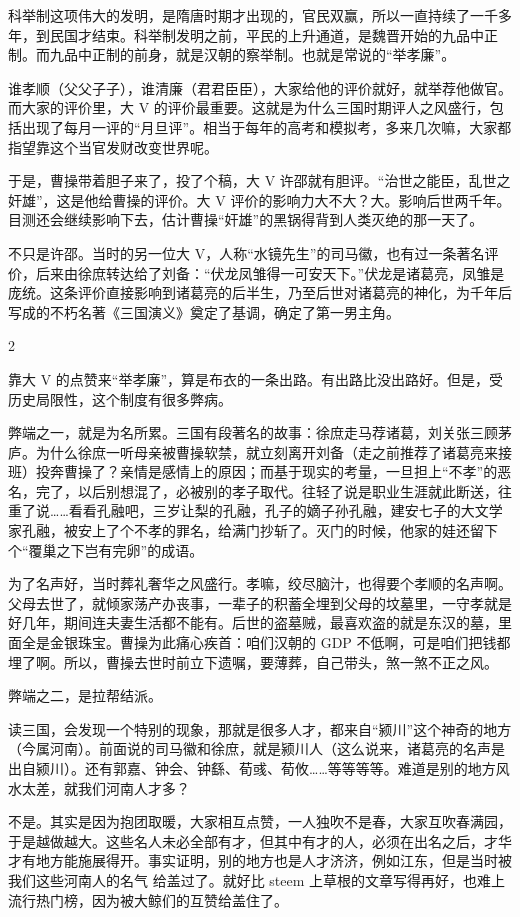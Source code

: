 \documentclass[]{ctexbook}
\begin{document}
科举制这项伟大的发明，是隋唐时期才出现的，官民双赢，所以一直持续了一千多年，到民国才结束。科举制发明之前，平民的上升通道，是魏晋开始的九品中正制。而九品中正制的前身，就是汉朝的察举制。也就是常说的``举孝廉''。

谁孝顺（父父子子），谁清廉（君君臣臣），大家给他的评价就好，就举荐他做官。而大家的评价里，大 V 的评价最重要。这就是为什么三国时期评人之风盛行，包括出现了每月一评的``月旦评''。相当于每年的高考和模拟考，多来几次嘛，大家都指望靠这个当官发财改变世界呢。

于是，曹操带着胆子来了，投了个稿，大 V 许邵就有胆评。``治世之能臣，乱世之奸雄''，这是他给曹操的评价。大 V 评价的影响力大不大？大。影响后世两千年。目测还会继续影响下去，估计曹操``奸雄''的黑锅得背到人类灭绝的那一天了。

不只是许邵。当时的另一位大 V，人称``水镜先生''的司马徽，也有过一条著名评价，后来由徐庶转达给了刘备：``伏龙凤雏得一可安天下。''伏龙是诸葛亮，凤雏是庞统。这条评价直接影响到诸葛亮的后半生，乃至后世对诸葛亮的神化，为千年后写成的不朽名著《三国演义》奠定了基调，确定了第一男主角。

2

靠大 V 的点赞来``举孝廉''，算是布衣的一条出路。有出路比没出路好。但是，受历史局限性，这个制度有很多弊病。

弊端之一，就是为名所累。三国有段著名的故事：徐庶走马荐诸葛，刘关张三顾茅庐。为什么徐庶一听母亲被曹操软禁，就立刻离开刘备（走之前推荐了诸葛亮来接班）投奔曹操了？亲情是感情上的原因；而基于现实的考量，一旦担上``不孝''的恶名，完了，以后别想混了，必被别的孝子取代。往轻了说是职业生涯就此断送，往重了说\ldots{}\ldots{}看看孔融吧，三岁让梨的孔融，孔子的嫡子孙孔融，建安七子的大文学家孔融，被安上了个不孝的罪名，给满门抄斩了。灭门的时候，他家的娃还留下个``覆巢之下岂有完卵''的成语。

为了名声好，当时葬礼奢华之风盛行。孝嘛，绞尽脑汁，也得要个孝顺的名声啊。父母去世了，就倾家荡产办丧事，一辈子的积蓄全埋到父母的坟墓里，一守孝就是好几年，期间连夫妻生活都不能有。后世的盗墓贼，最喜欢盗的就是东汉的墓，里面全是金银珠宝。曹操为此痛心疾首：咱们汉朝的 GDP 不低啊，可是咱们把钱都埋了啊。所以，曹操去世时前立下遗嘱，要薄葬，自己带头，煞一煞不正之风。

弊端之二，是拉帮结派。

读三国，会发现一个特别的现象，那就是很多人才，都来自``颍川''这个神奇的地方（今属河南）。前面说的司马徽和徐庶，就是颍川人（这么说来，诸葛亮的名声是出自颍川）。还有郭嘉、钟会、钟繇、荀彧、荀攸\ldots{}\ldots{}等等等等。难道是别的地方风水太差，就我们河南人才多？

不是。其实是因为抱团取暖，大家相互点赞，一人独吹不是春，大家互吹春满园，于是越做越大。这些名人未必全部有才，但其中有才的人，必须在出名之后，才华才有地方能施展得开。事实证明，别的地方也是人才济济，例如江东，但是当时被我们这些河南人的名气 给盖过了。就好比 steem 上草根的文章写得再好，也难上流行热门榜，因为被大鲸们的互赞给盖住了。
\end{document}
